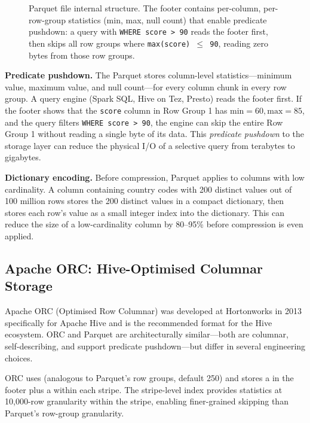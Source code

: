 \begin{figure}[h!t]
\begin{tikzpicture}
\end{tikzpicture}
\caption{Parquet file internal structure. The footer contains per-column,
         per-row-group statistics (min, max, null count) that enable predicate
         pushdown: a query with \texttt{WHERE score > 90} reads the footer
         first, then skips all row groups where \texttt{max(score) $\leq$ 90},
         reading zero bytes from those row groups.}
\label{fig:parquet-layout}
\end{figure}

\textbf{Predicate pushdown.} The Parquet  stores
column-level statistics---minimum value, maximum value, and null
count---for every column chunk in every row group. A query engine
(Spark SQL, Hive on Tez, Presto) reads the footer first. If the
footer shows that the \texttt{score} column in Row Group 1 has
$\text{min}=60, \text{max}=85$, and the query filters
\texttt{WHERE score > 90}, the engine can skip the entire Row Group 1
without reading a single byte of its data. This \emph{predicate
pushdown} to the storage layer can reduce the physical I/O of a
selective query from terabytes to gigabytes.

\textbf{Dictionary encoding.} Before compression, Parquet applies
 to columns with low cardinality. A column
containing country codes with 200 distinct values out of 100 million
rows stores the 200 distinct values in a compact dictionary, then
stores each row's value as a small integer index into the dictionary.
This can reduce the size of a low-cardinality column by 80--95\%
before compression is even applied.

\subsection{Apache ORC: Hive-Optimised Columnar Storage}
\label{subsec:orc}

Apache ORC (Optimised Row Columnar) was developed at Hortonworks in
2013 specifically for Apache Hive and is the recommended format for
the Hive ecosystem. ORC and Parquet are architecturally similar---both
are columnar, self-describing, and support predicate pushdown---but
differ in several engineering choices.

ORC uses  (analogous to Parquet's row groups, default
250\MB) and stores a  in the footer plus a
 within each stripe. The stripe-level index
provides statistics at 10{,}000-row granularity within the stripe,
enabling finer-grained skipping than Parquet's row-group granularity.


